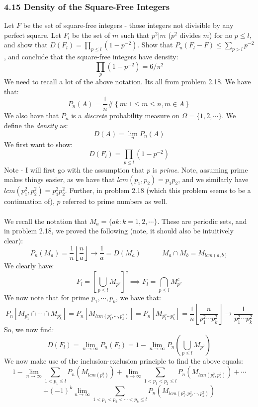\documentclass[12pt,a4paper]{article}
\newcommand{\1}[1]{\mathbbm{1}\left\{ #1 \right\}}
\newcommand{\floor}[1]{\left\lfloor #1 \right\rfloor}
\begin{document}
\subsubsection{4.15 Density of the Square-Free Integers} Let $F$ be the set of square-free integers - those integers not divisible by any perfect square. Let $F_l$ be the set of $m$ such that $p^2|m$ ($p^2$ divides $m$) for no $p \leq l$, and show that $D(F_l) = \prod_{p \leq l}(1-p^{-2})$. Show that $P_n(F_l - F) \leq \sum_{p > l} p^{-2}$, and conclude that the square-free integers have density:
$$
	\prod_p (1-p^{-2}) = 6/\pi^2
$$
We need to recall a lot of the above notation. Its all from problem 2.18. We have that:
$$
	P_n(A) = \frac{1}{n}\#\left\{m : 1 \leq m \leq n, m \in A\right\}
$$
We also have that $P_n$ is a \textit{discrete} probability measure on $\Omega = \{1, 2, \cdots\}$. We define the \textit{density} as:
$$
	D(A) = \lim_n P_n(A)
$$
We first want to show:
$$
	D(F_l) = \prod_{p \leq l}(1-p^{-2})
$$
Note - I will first go with the assumption that $p$ is \textit{prime}. Note, assuming prime makes things easier, as we have that $lcm(p_1,p_2) = p_1p_2$, and we similarly have $lcm(p_1^2,p_2^2) = p_1^2p_2^2$. Further, in problem 2.18 (which this problem seems to be a continuation of), $p$ referred to prime numbers as well.
\\\\
We recall the notation that $M_a = \{ak: k = 1, 2, \cdots\}$. These are periodic sets, and in problem 2.18, we proved the following (note, it should also be intuitively clear):
$$
	P_n(M_a) = \frac{1}{n}\floor{\frac{n}{a}} \to \frac{1}{a} = D(M_a)
	\quad\quad\quad
	M_a \cap M_b = M_{lcm(a,b)}
$$
We clearly have:
$$
	F_l = \left[\bigcup_{p \leq l} M_{p^2}\right]^c \implies
	F_l = \bigcap_{p \leq l} M_{p^2}^c
$$
We now note that for prime $p_1, \cdots, p_k$, we have that:
$$
	P_n\left[M_{p_1^2} \cap \cdots \cap M_{p_k^2}\right] =
	P_n\left[M_{lcm(p_1^2, \cdots, p_k^2)}\right] =
	P_n\left[M_{p_1^2 \cdots p_k^2}\right] =
	\frac{1}{n}\floor{\frac{n}{p_1^2 \cdots p_k^2}} \to 
	\frac{1}{p_1^2 \cdots p_k^2}
$$
So, we now find:
$$
	D(F_l) = 
	\lim_{n \to \infty} P_n(F_l) =
	1 - \lim_{n \to \infty} P_n\left(\bigcup_{p \leq l} M_{p^2}\right)
$$
We now make use of the inclusion-exclusion principle to find the above equals:
$$
	1 - 
	\lim_{n \to \infty} \sum_{1 < p_1 \leq l} P_n\left(M_{lcm(p_1^2)}\right) +
	\lim_{n \to \infty} \sum_{1 < p_1 < p_2 \leq l} P_n\left(M_{lcm(p_1^2,p_2^2)}\right) + \cdots
$$
$$
	+ (-1)^k \lim_{n \to \infty} \sum_{1 < p_1 < p_2 < \cdots < p_k \leq l} 
	P_n\left(M_{lcm(p_1^2,p_2^2, \cdots, p_k^2)}\right)
$$
\end{document}
